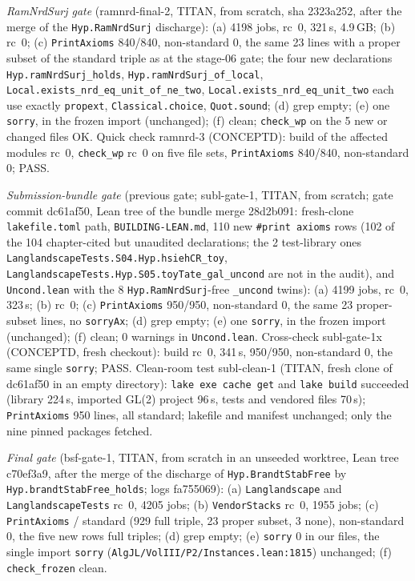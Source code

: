 \emph{RamNrdSurj gate} (ramnrd-final-2, TITAN, from scratch, sha 2323a252, after the merge of the \texttt{Hyp.RamNrdSurj}
discharge): (a) 4198 jobs, rc~0, 321\,s, 4.9\,GB; (b) rc~0; (c) \texttt{PrintAxioms} 840/840, non-standard 0,
the same 23 lines with a proper subset of the standard triple as at the stage-06 gate; the four new declarations
\texttt{Hyp.ramNrdSurj\_holds}, \texttt{Hyp.ramNrdSurj\_of\_local}, \texttt{Local.exists\_nrd\_eq\_unit\_of\_ne\_two},
\texttt{Local.exists\_nrd\_eq\_unit\_two} each use exactly \texttt{propext}, \texttt{Classical.choice}, \texttt{Quot.sound};
(d) grep empty; (e) one \texttt{sorry}, in the frozen import (unchanged); (f) clean; \texttt{check\_wp} on the 5 new or
changed files OK. Quick check ramnrd-3 (CONCEPTD): build of the affected modules rc~0, \texttt{check\_wp} rc~0 on five file
sets, \texttt{PrintAxioms} 840/840, non-standard 0; PASS.

\emph{Submission-bundle gate} (previous gate; subl-gate-1, TITAN, from scratch; gate commit dc61af50, Lean tree of the bundle merge 28d2b091: fresh-clone
\texttt{lakefile.toml} path, \texttt{BUILDING-LEAN.md}, 110 new \texttt{\#print axioms} rows (102 of the 104 chapter-cited but
unaudited declarations; the 2 test-library ones \texttt{LanglandscapeTests.S04.Hyp.hsiehCR\_toy},
\texttt{LanglandscapeTests.Hyp.S05.toyTate\_gal\_uncond} are not in the audit), and \texttt{Uncond.lean} with the 8
\texttt{Hyp.RamNrdSurj}-free \texttt{\_uncond} twins): (a) 4199 jobs, rc~0, 323\,s; (b) rc~0; (c) \texttt{PrintAxioms}
950/950, non-standard 0, the same 23 proper-subset lines, no \texttt{sorryAx}; (d) grep empty; (e) one
\texttt{sorry}, in the frozen import (unchanged); (f) clean; 0 warnings in \texttt{Uncond.lean}. Cross-check subl-gate-1x
(CONCEPTD, fresh checkout): build rc~0, 341\,s, 950/950, non-standard 0, the same single \texttt{sorry}; PASS.
Clean-room test subl-clean-1 (TITAN, fresh clone of dc61af50 in an empty directory): \texttt{lake exe cache get} and \texttt{lake build}
succeeded (library 224\,s, imported GL(2) project 96\,s, tests and vendored files 70\,s); \texttt{PrintAxioms} 950 lines, all standard;
lakefile and manifest unchanged; only the nine pinned packages fetched.

\emph{Final gate} (bsf-gate-1, TITAN, from scratch in an unseeded worktree, Lean tree c70ef3a9, after the merge of the discharge of \texttt{Hyp.BrandtStabFree} by \texttt{Hyp.brandtStabFree\_holds}; logs fa755069): (a) \texttt{Langlandscape} and \texttt{LanglandscapeTests} rc~0, 4205 jobs; (b) \texttt{VendorStacks} rc~0, 1955 jobs; (c) \texttt{PrintAxioms} \GateAudited/\GateAudited{} standard (929 full triple, 23 proper subset, 3 none), non-standard 0, the five new rows full triples; (d) grep empty; (e) \texttt{sorry} 0 in our files, the single import \texttt{sorry} (\texttt{AlgJL/VolIII/P2/Instances.lean:1815}) unchanged; (f) \texttt{check\_frozen} clean.

